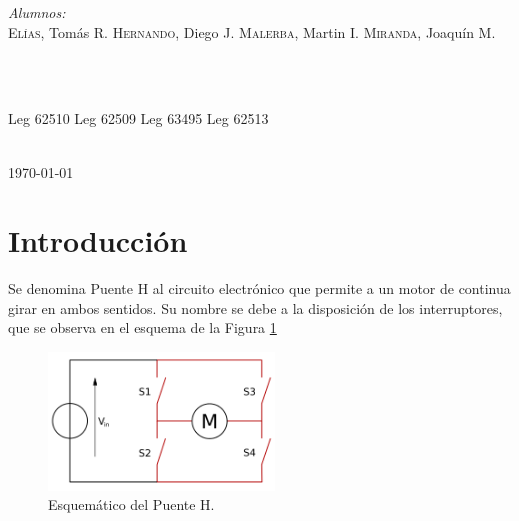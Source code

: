 \documentclass[11pt, a4paper]{article}
\begin{document}
\begin{titlepage}
		\begin{minipage}{0.4\textwidth}
			\begin{flushleft} \large
				\emph{Alumnos:}\\
				\textsc{Elías}, Tomás R. \newline %
				\textsc{Hernando}, Diego J. \newline %
				\textsc{Malerba}, Martin I.\newline %
				\textsc{Miranda}, Joaquín M.\newline %
			\end{flushleft}
		\end{minipage}
		~
		\begin{minipage}{0.4\textwidth}
			\begin{flushright} \large
				\emph{ } \\
				Leg 62510  \newline%
				Leg 62509  \newline%
				Leg 63495  \newline%
				Leg 62513  \newline%
			\end{flushright}
		\end{minipage}\\[1cm]
		
		{\large \today}\\ %
		
	\end{titlepage}
	
	
	\frontmatter
	\newpage
	\tableofcontents
	\newpage
	
	\mainmatter


\section{Introducción}

Se denomina Puente H al circuito electrónico que permite a un motor de continua girar en ambos sentidos. Su nombre se debe a la disposición de los interruptores, que se observa en el esquema de la Figura \ref{fig:puenteH}

\begin{figure}[h]
	\centering
	\includegraphics[width=6cm]{Imagenes/puenteH}
	\caption{Esquemático del Puente H.}
	\label{fig:puenteH}
\end{figure} 
\end{document}
